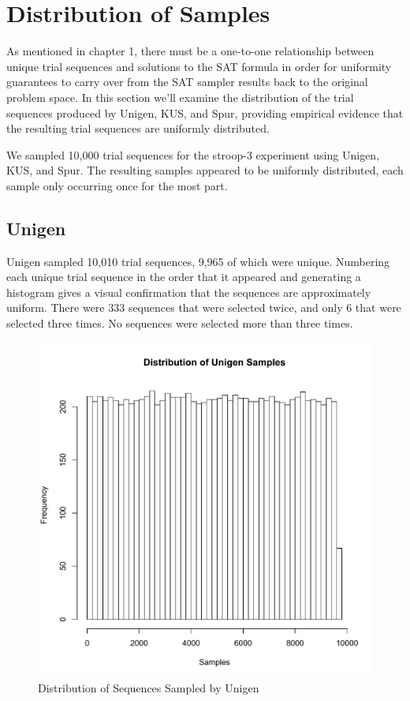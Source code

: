 \section{Distribution of Samples}

As mentioned in chapter 1, there must be a one-to-one relationship between unique trial sequences and solutions to the SAT formula in order for uniformity guarantees to carry over from the SAT sampler results back to the original problem space. In this section we'll examine the distribution of the trial sequences produced by Unigen, KUS, and Spur, providing empirical evidence that the resulting trial sequences are uniformly distributed.

We sampled 10,000 trial sequences for the stroop-3 experiment using Unigen, KUS, and Spur. The resulting samples appeared to be uniformly distributed, each sample only occurring once for the most part.

\subsection{Unigen}

Unigen sampled 10,010 trial sequences, 9,965 of which were unique. Numbering each unique trial sequence in the order that it appeared and generating a histogram gives a visual confirmation that the sequences are approximately uniform. There were 333 sequences that were selected twice, and only 6 that were selected three times. No sequences were selected more than three times.

\begin{figure}[t]
\centering
\centerline{\includegraphics[origin=c,width=12cm]{../figures/unigen-samples.pdf}}
\caption{Distribution of Sequences Sampled by Unigen}
\label{fig:unigen_samples}
\end{figure}


